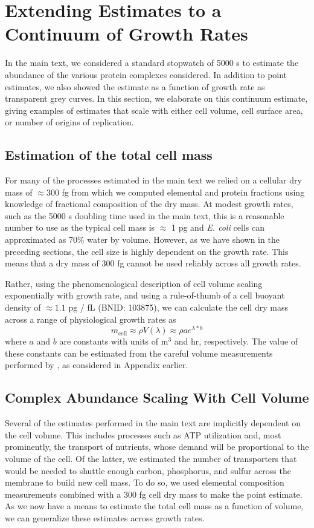 \section{Extending Estimates to a Continuum of Growth Rates}
\label{sec:SI_continuum_est}
In the main text, we considered a standard stopwatch of 5000 s to estimate the
abundance of the various protein complexes considered. In addition to point
estimates, we also showed the estimate as a function of growth rate as
transparent grey curves. In this section, we elaborate on this continuum
estimate, giving examples of estimates that scale with either cell volume, cell
surface area, or number of origins of replication.

\subsection{Estimation of the total cell mass}
For many of the processes estimated in the main text we relied on a cellular dry
mass of $\approx 300$ fg from which we computed elemental and protein fractions
using knowledge of fractional composition of the dry mass. At modest growth
rates, such as the 5000 s doubling time used in the main text, this is a
reasonable number to use as the typical cell mass is $\approx$ 1 pg and
\textit{E. coli} cells can approximated as 70\% water by volume. However, as we
have shown in the preceding sections, the cell size is highly dependent on the growth rate. This means that a dry mass of 300
fg cannot be used reliably across all growth rates.

Rather, using the phenomenological  description of cell volume scaling
exponentially with growth rate, and using a rule-of-thumb of a cell buoyant
density of $\approx 1.1$ pg / fL (BNID: 103875), we can calculate the cell dry mass across a
range of physiological growth rates as
\begin{equation}
    m_\text{cell} \approx \rho V(\lambda) \approx \rho ae^{\lambda * b}
    \label{eq:def_mcell}
\end{equation}
where $a$ and $b$ are constants with units of \textmu m$^3$  and hr,
respectively. The value of these constants can be estimated from the careful
volume measurements performed by \cite{si2017}, as considered in Appendix  earlier.

\subsection{Complex Abundance Scaling With Cell Volume}
Several of the estimates performed in the main text are implicitly dependent
on the cell volume. This includes processes such as ATP utilization and, most
prominently, the transport of nutrients, whose demand will be proportional to the volume
of the cell. Of the latter, we estimated the
number of transporters that would be needed to shuttle enough carbon,
phosphorus, and sulfur across the membrane to build new cell mass. To do so,
we used elemental composition measurements combined with a 300 fg cell dry
mass to make the point estimate. As we now have a means to estimate the total
cell mass as a function of volume, we can generalize these estimates across
growth rates.

